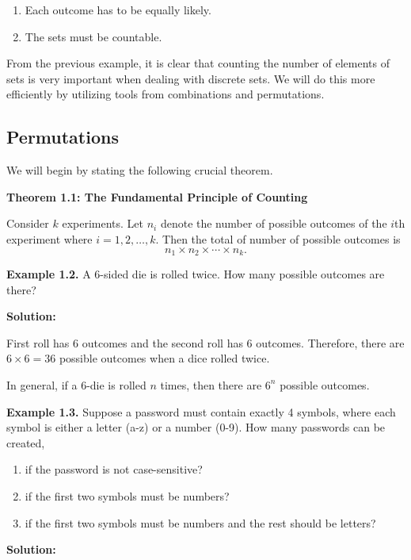 \documentclass[
  12pt,
]{krantzNoCorner}
\providecommand{\tightlist}{%
  \setlength{\itemsep}{0pt}\setlength{\parskip}{0pt}}
\begin{document}
\begin{enumerate}
\def\labelenumi{\arabic{enumi}.}
\tightlist
\item
  Each outcome has to be equally likely.
\item
  The sets must be countable.
\end{enumerate}

From the previous example, it is clear that counting the number of
elements of sets is very important when dealing with discrete sets. We
will do this more efficiently by utilizing tools from combinations and
permutations.

\hypertarget{permutations}{%
\subsection{Permutations}\label{permutations}}

We will begin by stating the following crucial theorem.

\textbf{Theorem 1.1: The Fundamental Principle of Counting}

Consider \(k\) experiments. Let \(n_i\) denote the number of possible
outcomes of the \(i\)th experiment where \(i=1,2,\dots,k.\) Then the total
of number of possible outcomes is
\[n_1\times n_2\times\cdots\times n_k.\]

\textbf{Example 1.2.} A 6-sided die is rolled twice. How many possible
outcomes are there?

\textbf{Solution:}

First roll has 6 outcomes and the second roll has 6 outcomes. Therefore,
there are \(6\times 6 = 36\) possible outcomes when a dice rolled twice.

In general, if a 6-die is rolled \(n\) times, then there are \(6^n\)
possible outcomes.

\textbf{Example 1.3.} Suppose a password must contain exactly 4 symbols,
where each symbol is either a letter (a-z) or a number (0-9). How many
passwords can be created,

\begin{enumerate}
\def\labelenumi{\arabic{enumi}.}
\tightlist
\item
  if the password is not case-sensitive?
\item
  if the first two symbols must be numbers?
\item
  if the first two symbols must be numbers and the rest should be
  letters?
\end{enumerate}

\textbf{Solution:}
\end{document}
